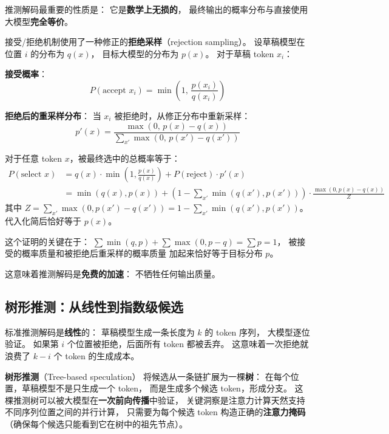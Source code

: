 推测解码最重要的性质是：
它是\textbf{数学上无损的}，
最终输出的概率分布与直接使用大模型\textbf{完全等价}。

接受/拒绝机制使用了一种修正的\textbf{拒绝采样}（rejection sampling）。
设草稿模型在位置 $i$ 的分布为 $q(x)$，
目标大模型的分布为 $p(x)$。
对于草稿 token $x_i$：

\textbf{接受概率}：
\begin{equation}
  P(\text{accept } x_i) = \min\!\left(1,\, \frac{p(x_i)}{q(x_i)}\right)
\end{equation}

\textbf{拒绝后的重采样分布}：
当 $x_i$ 被拒绝时，从修正分布中重新采样：
\begin{equation}
  p'(x) = \frac{\max(0,\, p(x) - q(x))}{\sum_{x'} \max(0,\, p(x') - q(x'))}
\end{equation}

\begin{whybox}[为什么这个过程保证输出分布不变？]
对于任意 token $x$，被最终选中的总概率等于：
\begin{align}
  P(\text{select } x) &= q(x) \cdot \min\!\left(1, \frac{p(x)}{q(x)}\right) + P(\text{reject}) \cdot p'(x) \\
  &= \min(q(x), p(x)) + \left(1 - \sum_{x'} \min(q(x'), p(x'))\right) \cdot \frac{\max(0, p(x) - q(x))}{Z}
\end{align}
其中 $Z = \sum_{x'} \max(0, p(x') - q(x')) = 1 - \sum_{x'} \min(q(x'), p(x'))$。
代入化简后恰好等于 $p(x)$。

这个证明的关键在于：
$\sum \min(q, p) + \sum \max(0, p-q) = \sum p = 1$，
被接受的概率质量和被拒绝后重采样的概率质量
加起来恰好等于目标分布 $p$。
\end{whybox}

这意味着推测解码是\textbf{免费的加速}：
不牺牲任何输出质量。

\subsection{树形推测：从线性到指数级候选}

标准推测解码是\textbf{线性}的：
草稿模型生成一条长度为 $k$ 的 token 序列，
大模型逐位验证。
如果第 $i$ 个位置被拒绝，后面所有 token 都被丢弃。
这意味着一次拒绝就浪费了 $k - i$ 个 token 的生成成本。

\textbf{树形推测}（Tree-based speculation）
将候选从一条链扩展为一棵\textbf{树}：
在每个位置，草稿模型不是只生成一个 token，
而是生成多个候选 token，形成分支。
这棵推测树可以被大模型在\textbf{一次前向传播}中验证，
关键洞察是注意力计算天然支持
不同序列位置之间的并行计算，
只需要为每个候选 token 构造正确的\textbf{注意力掩码}
（确保每个候选只能看到它在树中的祖先节点）。

